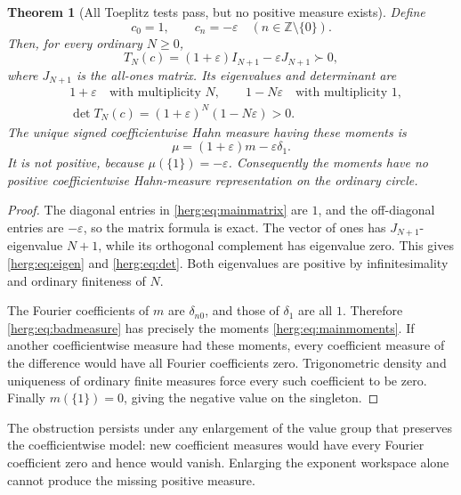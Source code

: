 \documentclass[11pt,letterpaper]{article}
\newtheorem{theorem}{Theorem}[section]
\theoremstyle{definition}
\newcommand{\Z}{\mathbb Z}\newcommand{\N}{\mathbb N}
\newcommand{\eps}{\varepsilon}
\numberwithin{equation}{section}
\begin{document}
\begin{theorem}[All Toeplitz tests pass, but no positive measure exists]\label{herg:thm:negativeatom}
Define
\begin{equation}\label{herg:eq:mainmoments}
 c_0=1,\qquad c_n=-\eps\quad(n\in\Z\setminus\{0\}).
\end{equation}
Then, for every ordinary $N\ge0$,
\begin{equation}\label{herg:eq:mainmatrix}
 T_N(c)=(1+\eps)I_{N+1}-\eps J_{N+1}\succ0,
\end{equation}
where $J_{N+1}$ is the all-ones matrix. Its eigenvalues and determinant are
\begin{align}
 &1+\eps\quad\text{with multiplicity }N,
 \qquad 1-N\eps\quad\text{with multiplicity }1,\label{herg:eq:eigen}\\
 &\det T_N(c)=(1+\eps)^N(1-N\eps)>0.\label{herg:eq:det}
\end{align}
The unique signed coefficientwise Hahn measure having these moments is
\begin{equation}\label{herg:eq:badmeasure}
 \mu=(1+\eps)m-\eps\delta_1.
\end{equation}
It is not positive, because $\mu(\{1\})=-\eps$. Consequently the moments have no positive coefficientwise Hahn-measure representation on the ordinary circle.
\end{theorem}
\begin{proof}
The diagonal entries in \eqref{herg:eq:mainmatrix} are $1$, and the off-diagonal entries are $-\eps$, so the matrix formula is exact. The vector of ones has $J_{N+1}$-eigenvalue $N+1$, while its orthogonal complement has eigenvalue zero. This gives \eqref{herg:eq:eigen} and \eqref{herg:eq:det}. Both eigenvalues are positive by infinitesimality and ordinary finiteness of $N$.

The Fourier coefficients of $m$ are $\delta_{n0}$, and those of $\delta_1$ are all $1$. Therefore \eqref{herg:eq:badmeasure} has precisely the moments \eqref{herg:eq:mainmoments}. If another coefficientwise measure had these moments, every coefficient measure of the difference would have all Fourier coefficients zero. Trigonometric density and uniqueness of ordinary finite measures force every such coefficient to be zero. Finally $m(\{1\})=0$, giving the negative value on the singleton.
\end{proof}

The obstruction persists under any enlargement of the value group that preserves the coefficientwise model: new coefficient measures would have every Fourier coefficient zero and hence would vanish. Enlarging the exponent workspace alone cannot produce the missing positive measure.
\end{document}
